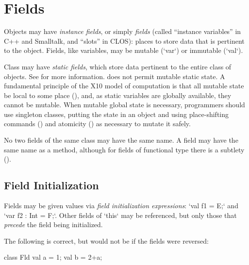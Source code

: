 \section{Fields}
\label{FieldDefinitions}

Objects may have {\em instance fields}, or simply {\em fields} (called
``instance variables'' in C++ and Smalltalk, and ``slots'' in CLOS): places to
store data that is pertinent to the object.  Fields, like variables, may be
mutable (\xcd`var`) or immutable (\xcd`val`).  

Class may have {\em static fields}, which store data pertinent to the
entire class of objects.  See  for more
information. 
\Xten{} does not permit mutable static state. A fundamental principle of the
X10 model of computation is that all mutable state be local to some place
(), and, as static variables are
globally available, they
cannot be mutable. When mutable global state is necessary, programmers should
use singleton classes, putting the state in an object and using place-shifting
commands () and atomicity () as necessary
to mutate it safely.


No two fields of the same class may have the same name.  A field may have the
same name as a method, although for fields of functional type there is a
subtlety ().  

\subsection{Field Initialization}

Fields may be given values via {\em field initialization expressions}:
\xcd`val f1 = E;` and \xcd`var f2 : Int = F;`. Other fields of \xcd`this` may
be referenced, but only those that {\em precede} the field being initialized.


\begin{ex}The following is correct, but would not be if the fields were
reversed:

\begin{xten}
class Fld{
  val a = 1;
  val b = 2+a;
}
\end{xten}
\end{ex}

